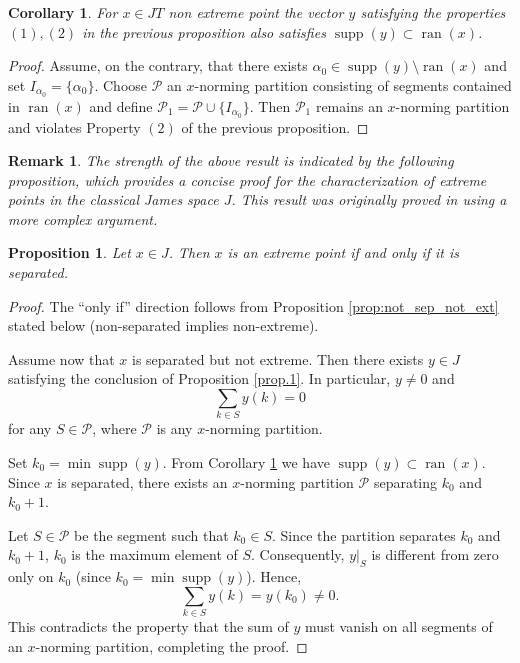 \documentclass[11pt,a4paper]{amsart}
\newtheorem{proposition}[theorem]{Proposition}
\newtheorem{corollary}[theorem]{Corollary}
\newtheorem{remark}[theorem]{Remark}
\newcommand{\JT}{JT}
\newcommand{\supp}{\operatorname{supp}}
\newcommand{\ran}{\operatorname{ran}}
\newcommand{\J}{J}
\begin{document}
\begin{corollary}\label{C2.10} For $x\in \JT$ non extreme point the vector $y$ satisfying  the properties $(1), (2)$  in the previous proposition also satisfies  
$\supp(y) \subset \ran(x)$.
\end{corollary}
\begin{proof} Assume, on the contrary, that there exists $\alpha_0 \in \supp(y) \setminus \ran(x) $ and set $I_{\alpha_0} =
\{\alpha_0\}$. Choose $\mathcal{P}$  an $x$-norming partition consisting of segments contained in $\ran(x)$ and define  
$\mathcal{P}_1 = \mathcal{P} \cup \{ I_{\alpha_0} \}$. Then $\mathcal{P}_1$ remains an $x$-norming partition and violates Property $(2)$ of the previous proposition.
\end{proof}
\begin{remark}
    The strength of the above result is indicated by the following proposition, which provides a concise proof for the characterization of extreme points in the classical James space $\J$. This result was originally proved in \cite{AG2025} using a more complex argument.
\end{remark}

\begin{proposition}
    Let $x \in \J$. Then $x$ is an extreme point if and only if it is separated.
\end{proposition}

\begin{proof}
    The ``only if'' direction follows  from Proposition \ref{prop:not_sep_not_ext} stated below (non-separated implies non-extreme).
    
    Assume now that $x$ is separated but not extreme. Then there exists $y \in \J$ satisfying the conclusion of Proposition \ref{prop.1}. In particular, $y \neq 0$ and
    \[ \sum_{k \in S} y(k) = 0 \]
    for any $S \in \mathcal{P}$, where $\mathcal{P}$ is any $x$-norming partition.
    
    Set $k_0 = \min \supp(y)$. From Corollary \ref{C2.10} we have  $\supp(y) \subset \ran(x)$. Since $x$ is separated, there exists an $x$-norming partition $\mathcal{P}$ separating $k_0$ and $k_0 + 1$.
    
    Let $S \in \mathcal{P}$ be the segment such that $k_0 \in S$. Since the partition separates $k_0$ and $k_0+1$, $k_0$ is the maximum element of $S$. Consequently, $y|_S$ is different from zero only on $k_0$ (since $k_0 = \min \supp(y)$). Hence,
    \[ \sum_{k \in S} y(k) = y(k_0) \neq 0. \]
    This contradicts the property that the sum of $y$ must vanish on all segments of an $x$-norming partition, completing the proof.
\end{proof}
\end{document}
